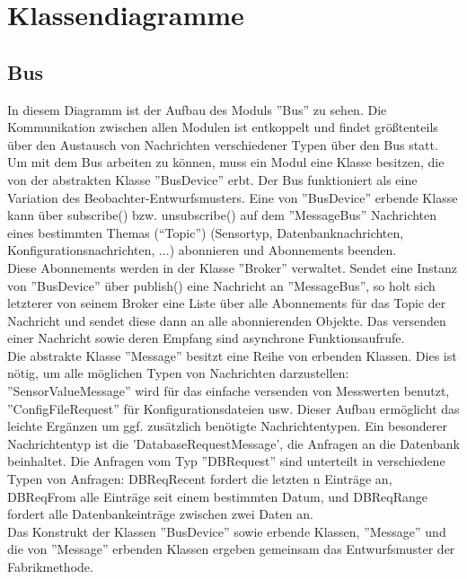 \documentclass[entwurf.tex]{subfiles}
\begin{document}
\chapter{Klassendiagramme}
	\section{Bus}
		
  		In diesem Diagramm ist der Aufbau des Moduls ''Bus'' zu sehen. Die Kommunikation zwischen allen Modulen ist entkoppelt und findet größtenteils über den Austausch von Nachrichten verschiedener Typen über den Bus statt. Um mit dem Bus arbeiten zu können, muss ein Modul eine Klasse besitzen, die von der abstrakten Klasse ''BusDevice'' erbt. Der Bus funktioniert als eine Variation des Beobachter-Entwurfsmusters. Eine von ''BusDevice'' erbende Klasse kann über subscribe() bzw. unsubscribe() auf dem ''MessageBus'' Nachrichten eines bestimmten Themas (``Topic'') (Sensortyp, Datenbanknachrichten, Konfigurationsnachrichten, ...) abonnieren und Abonnements beenden. \\
  		Diese Abonnements werden in der Klasse ''Broker'' verwaltet. Sendet eine Instanz von ''BusDevice'' über publish() eine Nachricht an ''MessageBus'', so holt sich letzterer von seinem Broker eine Liste über alle Abonnements für das Topic der Nachricht und sendet diese dann an alle abonnierenden Objekte. Das versenden einer Nachricht sowie deren Empfang sind asynchrone Funktionsaufrufe. \\
  		Die abstrakte Klasse ''Message'' besitzt eine Reihe von erbenden Klassen. Dies ist nötig, um alle möglichen Typen von Nachrichten darzustellen: ''SensorValueMessage'' wird für das einfache versenden von Messwerten benutzt, ''ConfigFileRequest'' für Konfigurationsdateien usw. Dieser Aufbau ermöglicht das leichte Ergänzen um ggf. zusätzlich benötigte Nachrichtentypen. Ein besonderer Nachrichtentyp ist die 'DatabaseRequestMessage', die Anfragen an die Datenbank beinhaltet. Die Anfragen vom Typ ''DBRequest'' sind unterteilt in verschiedene Typen von Anfragen: DBReqRecent fordert die letzten n Einträge an, DBReqFrom alle Einträge seit einem bestimmten Datum, und DBReqRange fordert alle Datenbankeinträge zwischen zwei Daten an. \\
  		Das Konstrukt der Klassen ''BusDevice'' sowie erbende Klassen, ''Message'' und die von ''Message'' erbenden Klassen ergeben gemeinsam das Entwurfsmuster der Fabrikmethode.
  		
\end{document}
